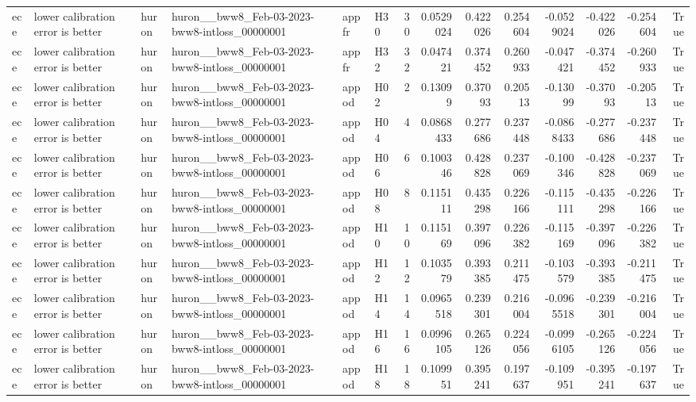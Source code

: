 \begin{longtable}{llllllrrrrrrrr}
ece & lower calibration error is better & huron & huron\_\_bww8\_Feb-03-2023-bww8-intloss\_00000001 & appfr & H30 & 30 & 0.0529024 & 0.422026 & 0.254604 & -0.0529024 & -0.422026 & -0.254604 & True \\
ece & lower calibration error is better & huron & huron\_\_bww8\_Feb-03-2023-bww8-intloss\_00000001 & appfr & H32 & 32 & 0.047421 & 0.374452 & 0.260933 & -0.047421 & -0.374452 & -0.260933 & True \\
ece & lower calibration error is better & huron & huron\_\_bww8\_Feb-03-2023-bww8-intloss\_00000001 & appod & H02 & 2 & 0.13099 & 0.37093 & 0.20513 & -0.13099 & -0.37093 & -0.20513 & True \\
ece & lower calibration error is better & huron & huron\_\_bww8\_Feb-03-2023-bww8-intloss\_00000001 & appod & H04 & 4 & 0.0868433 & 0.277686 & 0.237448 & -0.0868433 & -0.277686 & -0.237448 & True \\
ece & lower calibration error is better & huron & huron\_\_bww8\_Feb-03-2023-bww8-intloss\_00000001 & appod & H06 & 6 & 0.100346 & 0.428828 & 0.237069 & -0.100346 & -0.428828 & -0.237069 & True \\
ece & lower calibration error is better & huron & huron\_\_bww8\_Feb-03-2023-bww8-intloss\_00000001 & appod & H08 & 8 & 0.115111 & 0.435298 & 0.226166 & -0.115111 & -0.435298 & -0.226166 & True \\
ece & lower calibration error is better & huron & huron\_\_bww8\_Feb-03-2023-bww8-intloss\_00000001 & appod & H10 & 10 & 0.115169 & 0.397096 & 0.226382 & -0.115169 & -0.397096 & -0.226382 & True \\
ece & lower calibration error is better & huron & huron\_\_bww8\_Feb-03-2023-bww8-intloss\_00000001 & appod & H12 & 12 & 0.103579 & 0.393385 & 0.211475 & -0.103579 & -0.393385 & -0.211475 & True \\
ece & lower calibration error is better & huron & huron\_\_bww8\_Feb-03-2023-bww8-intloss\_00000001 & appod & H14 & 14 & 0.0965518 & 0.239301 & 0.216004 & -0.0965518 & -0.239301 & -0.216004 & True \\
ece & lower calibration error is better & huron & huron\_\_bww8\_Feb-03-2023-bww8-intloss\_00000001 & appod & H16 & 16 & 0.0996105 & 0.265126 & 0.224056 & -0.0996105 & -0.265126 & -0.224056 & True \\
ece & lower calibration error is better & huron & huron\_\_bww8\_Feb-03-2023-bww8-intloss\_00000001 & appod & H18 & 18 & 0.109951 & 0.395241 & 0.197637 & -0.109951 & -0.395241 & -0.197637 & True \\

\end{longtable}
